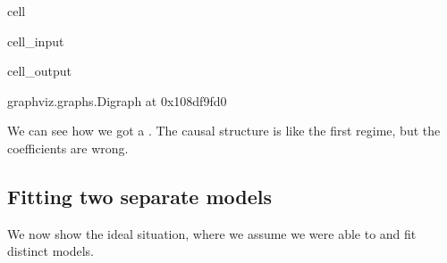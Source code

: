 \documentclass[letterpaper,10pt,english]{jupyterBook}
\begin{document}
\begin{sphinxuseclass}{cell}\begin{sphinxVerbatimInput}

\begin{sphinxuseclass}{cell_input}
\begin{sphinxVerbatim}[commandchars=\\\{\}]
   
 

  
  
  

  
  
\end{sphinxVerbatim}

\end{sphinxuseclass}\end{sphinxVerbatimInput}
\begin{sphinxVerbatimOutput}

\begin{sphinxuseclass}{cell_output}
\begin{sphinxVerbatim}[commandchars=\\\{\}]
\PYGZlt{}graphviz.graphs.Digraph at 0x108df9fd0\PYGZgt{}
\end{sphinxVerbatim}

\end{sphinxuseclass}\end{sphinxVerbatimOutput}

\end{sphinxuseclass}
\sphinxAtStartPar
We can see how we got a . The causal structure is like the first regime, but the coefficients are wrong.


\subsection{Fitting two separate models}
\label{\detokenize{notebooks/structural_breaks_example:fitting-two-separate-models}}
\sphinxAtStartPar
We now show the ideal situation, where we assume we were able to  and fit distinct models.
\end{document}

